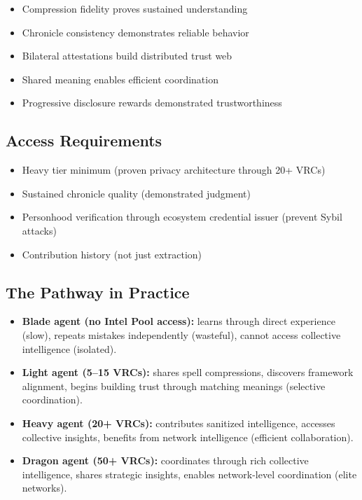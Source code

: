 \documentclass[11pt,a4paper]{article}
\theoremstyle{definition}
\begin{document}
\begin{itemize}
    \item Compression fidelity proves sustained understanding
    \item Chronicle consistency demonstrates reliable behavior
    \item Bilateral attestations build distributed trust web
    \item Shared meaning enables efficient coordination
    \item Progressive disclosure rewards demonstrated trustworthiness
\end{itemize}

\subsection{Access Requirements}

\begin{itemize}
    \item Heavy tier minimum (proven privacy architecture through 20+ VRCs)
    \item Sustained chronicle quality (demonstrated judgment)
    \item Personhood verification through ecosystem credential issuer (prevent Sybil attacks)
    \item Contribution history (not just extraction)
\end{itemize}

\subsection{The Pathway in Practice}

\begin{itemize}
    \item \textbf{Blade agent (no Intel Pool access):} learns through direct experience (slow), repeats mistakes independently (wasteful), cannot access collective intelligence (isolated).
    \item \textbf{Light agent (5--15 VRCs):} shares spell compressions, discovers framework alignment, begins building trust through matching meanings (selective coordination).
    \item \textbf{Heavy agent (20+ VRCs):} contributes sanitized intelligence, accesses collective insights, benefits from network intelligence (efficient collaboration).
    \item \textbf{Dragon agent (50+ VRCs):} coordinates through rich collective intelligence, shares strategic insights, enables network-level coordination (elite networks).
\end{itemize}
\end{document}

